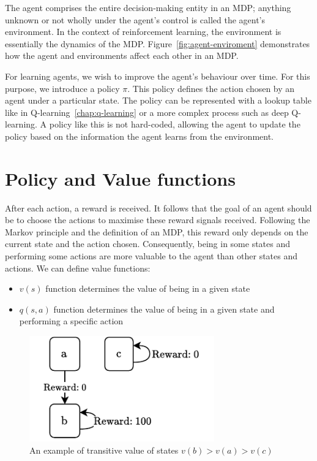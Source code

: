 \documentclass[]{final_report}
\begin{document}
The agent comprises the entire decision-making entity in an MDP; anything unknown or not wholly under the agent's control is called the agent's environment. In the context of reinforcement learning, the environment is essentially the dynamics of the MDP. Figure~\ref{fig:agent-enviroment} demonstrates how the agent and environments affect each other in an MDP. 

\label{policy-informal-definition}
For learning agents, we wish to improve the agent's behaviour over time. For this purpose, we introduce a policy $\pi$. This policy defines the action chosen by an agent under a particular state. The policy can be represented with a lookup table like in Q-learning~\ref{chap:q-learning} or a more complex process such as deep Q-learning. A policy like this is not hard-coded, allowing the agent to update the policy based on the information the agent learns from the environment. 


\section{Policy and Value functions}

After each action, a reward is received. It follows that the goal of an agent should be to choose the actions to maximise these reward signals received. Following the Markov principle and the definition of an MDP, this reward only depends on the current state and the action chosen. Consequently, being in some states and performing some actions are more valuable to the agent than other states and actions. We can define value functions: 
\begin{itemize}
  \item $v(s)$ function determines the value of being in a given state
  \item $q(s, a)$ function determines the value of being in a given state and performing a specific action
\end{itemize}



\begin{figure}[H]
  \centering
  
  \includegraphics[width=8cm]{reward-example-2}
  
  \caption{\label{fig:reward-example} An example of transitive value of states $v(b) > v(a) > v(c)$}
\end{figure}
\end{document}
